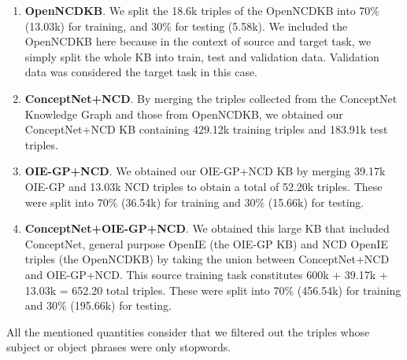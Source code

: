 \documentclass[preprint]{elsarticle}
\begin{document}
\begin{enumerate}
    \item \textbf{OpenNCDKB}.
We split the 18.6k triples of the OpenNCDKB into 70\% (13.03k) for training, and 30\% for testing (5.58k). We included the OpenNCDKB here because in the context of source and target task, we simply split the whole KB into train, test and validation data. Validation data was considered the target task in this case.

    \item \textbf{ConceptNet+NCD}.
By merging the triples collected from the ConceptNet Knowledge Graph and those from OpenNCDKB, we obtained our ConceptNet+NCD KB containing 429.12k training triples and 183.91k test triples.

    \item \textbf{OIE-GP+NCD}.
We obtained our OIE-GP+NCD KB by merging 39.17k OIE-GP and 13.03k NCD triples to obtain a total of 52.20k triples. These were split into 70\% (36.54k) for training and 30\% (15.66k) for testing.

    \item \textbf{ConceptNet+OIE-GP+NCD}. We obtained this large KB that included ConceptNet, general purpose OpenIE (the OIE-GP KB) and NCD OpenIE triples (the OpenNCDKB) by taking the union between ConceptNet+NCD and OIE-GP+NCD. This source training task constitutes 600k + 39.17k + 13.03k = 652.20 total triples. These were split into 70\% (456.54k) for training and 30\% (195.66k) for testing.
\end{enumerate}

All the mentioned quantities consider that we filtered out the triples whose subject or object phrases were only stopwords.





\end{document}
